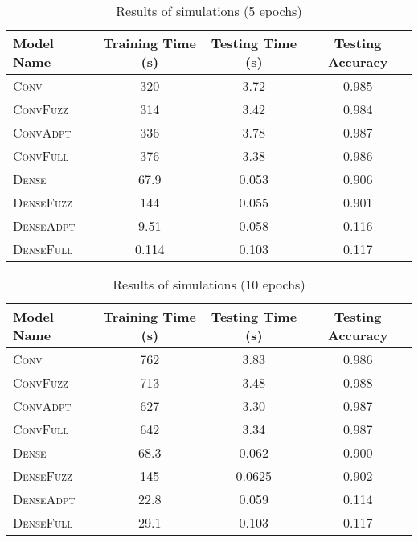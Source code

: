 \documentclass{article}
\begin{document}
\begin{table}[h]
  \caption{Results of simulations (5 epochs)}
  \label{tbl:results}
  \centering
  \begin{tabular}{lSSS}
    \toprule
    {Model Name} & {Training Time (s)} & {Testing Time (s)} & {Testing Accuracy} \\
    \midrule
    {\textsc{Conv}}         & 320 & 3.72 & 0.985 \\
    {\textsc{ConvFuzz}}     & 314 & 3.42 & 0.984 \\
    {\textsc{ConvAdpt}}     & 336 & 3.78 & 0.987 \\
    {\textsc{ConvFull}}     & 376 & 3.38 & 0.986 \\
    {\textsc{Dense}}        & 67.9 & 0.053 & 0.906 \\
    {\textsc{DenseFuzz}}    & 144 & 0.055 & 0.901 \\
    {\textsc{DenseAdpt}}    & 9.51 & 0.058 & 0.116 \\
    {\textsc{DenseFull}}    & 0.114 & 0.103 & 0.117 \\
    \bottomrule
  \end{tabular}
\end{table}

\begin{table}[h]
  \caption{Results of simulations (10 epochs)}
  \label{tbl:results2}
  \centering
  \begin{tabular}{lSSS}
    \toprule
    {Model Name} & {Training Time (s)} & {Testing Time (s)} & {Testing Accuracy} \\
    \midrule
    {\textsc{Conv}}         & 762 & 3.83 & 0.986 \\
    {\textsc{ConvFuzz}}     & 713 & 3.48 & 0.988 \\
    {\textsc{ConvAdpt}}     & 627 & 3.30 & 0.987 \\
    {\textsc{ConvFull}}     & 642 & 3.34 & 0.987 \\
    {\textsc{Dense}}        & 68.3 & 0.062 & 0.900 \\
    {\textsc{DenseFuzz}}    & 145 & 0.0625 & 0.902 \\
    {\textsc{DenseAdpt}}    & 22.8 & 0.059 & 0.114 \\
    {\textsc{DenseFull}}    & 29.1 & 0.103 & 0.117 \\
    \bottomrule
  \end{tabular}
\end{table}
\end{document}
